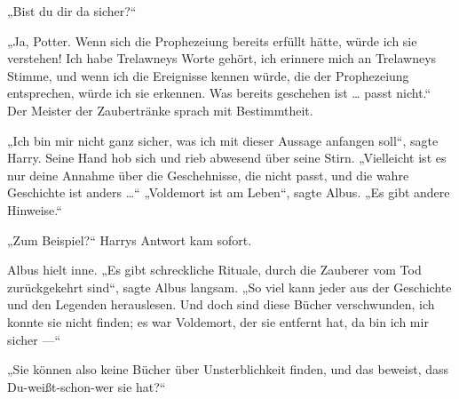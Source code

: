 „Bist du dir da sicher?“

„Ja, Potter. Wenn sich die Prophezeiung bereits erfüllt hätte, würde ich sie verstehen! Ich habe Trelawneys Worte gehört, ich erinnere mich an Trelawneys Stimme, und wenn ich die Ereignisse kennen würde, die der Prophezeiung entsprechen, würde ich sie erkennen. Was bereits geschehen ist … passt nicht.“ Der Meister der Zaubertränke sprach mit Bestimmtheit.

„Ich bin mir nicht ganz sicher, was ich mit dieser Aussage anfangen soll“, sagte Harry. Seine Hand hob sich und rieb abwesend über seine Stirn.
„Vielleicht ist es nur deine Annahme über die Geschehnisse, die nicht passt, und die wahre Geschichte ist anders …“
„Voldemort ist am Leben“, sagte Albus.
„Es gibt andere Hinweise.“

„Zum Beispiel?“ Harrys Antwort kam sofort.

Albus hielt inne.
„Es gibt schreckliche Rituale, durch die Zauberer vom Tod zurückgekehrt sind“, sagte Albus langsam.
„So viel kann jeder aus der Geschichte und den Legenden herauslesen. Und doch sind diese Bücher verschwunden, ich konnte sie nicht finden; es war Voldemort, der sie entfernt hat, da bin ich mir sicher —“

„Sie können also keine Bücher über Unsterblichkeit finden, und das beweist, dass Du-weißt-schon-wer sie hat?“

